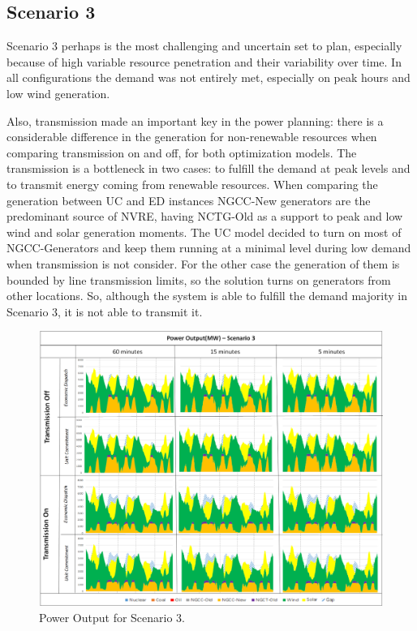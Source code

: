 \documentclass[12pt,LUDisStyle,twosided]{book}
\begin{document}
\subsection{Scenario 3}

Scenario 3 perhaps is the most challenging and uncertain set to plan, especially because of high variable resource penetration and their variability over time. In all configurations the demand was not entirely met, especially on peak hours and low wind generation. 

Also, transmission made an important key in the power planning: there is a considerable difference in the generation for non-renewable resources when comparing transmission on and off, for both optimization models. The transmission is a bottleneck in two cases: to fulfill the demand at peak levels and to transmit energy coming from renewable resources. When comparing the generation between UC and ED instances NGCC-New generators are the predominant source of NVRE, having NCTG-Old as a support to peak and low wind and solar generation moments. The UC model decided to turn on most of NGCC-Generators and keep them running at a minimal level during low demand when transmission is not consider. For the other case the generation of them is bounded by line transmission limits, so the solution turns on generators from other locations. So, although the system is able to fulfill the demand majority in Scenario 3, it is not able to transmit it.

\begin{figure} 
  \centering
	  \includegraphics[width=\textwidth,height=\textheight,keepaspectratio]{PowerOutputScenario3.png}
  \caption{Power Output for Scenario 3.}
  \label{fig:powerOutputScenario3}
\end{figure}
\end{document}
